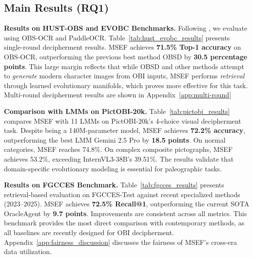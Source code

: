 \documentclass{article}
\begin{document}
\subsection{Main Results (RQ1)}
\textbf{Results on HUST-OBS and EVOBC Benchmarks.} Following \cite{guan2024deciphering}, we evaluate using OBS-OCR and PaddleOCR. Table~\ref{tab:hust_evobc_results} presents single-round decipherment results. MSEF achieves \textbf{71.5\% Top-1 accuracy} on OBS-OCR, outperforming the previous best method OBSD by \textbf{30.5 percentage points}. This large margin reflects that while OBSD and other methods attempt to \textit{generate} modern character images from OBI inputs, MSEF performs \textit{retrieval} through learned evolutionary manifolds, which proves more effective for this task. %
Multi-round decipherment results are shown in Appendix~\ref{app:multi-round}


\textbf{Comparison with LMMs on PictOBI-20k.} Table~\ref{tab:pictobi_results} compares MSEF with 11 LMMs on PictOBI-20k's 4-choice visual decipherment task. Despite being a 140M-parameter model, MSEF achieves \textbf{72.2\% accuracy}, outperforming the best LMM Gemini 2.5 Pro by \textbf{18.5 points}. On normal categories, MSEF reaches 74.8\%. On complex composite pictographs, MSEF achieves 53.2\%, exceeding InternVL3-38B's 39.51\%. The results validate that domain-specific evolutionary modeling is essential for paleographic tasks.


\textbf{Results on FGCCES Benchmark.} Table~\ref{tab:fgcces_results} presents retrieval-based evaluation on FGCCES-Test against recent specialized methods (2023--2025). MSEF achieves \textbf{72.5\% Recall@1}, outperforming the current SOTA OracleAgent by \textbf{9.7 points}. Improvements are consistent across all metrics. This benchmark provides the most direct comparison with contemporary methods, as all baselines are recently designed for OBI decipherment. Appendix~\ref{app:fairness_discussion} discusses the fairness of MSEF's cross-era data utilization.


\end{document}
